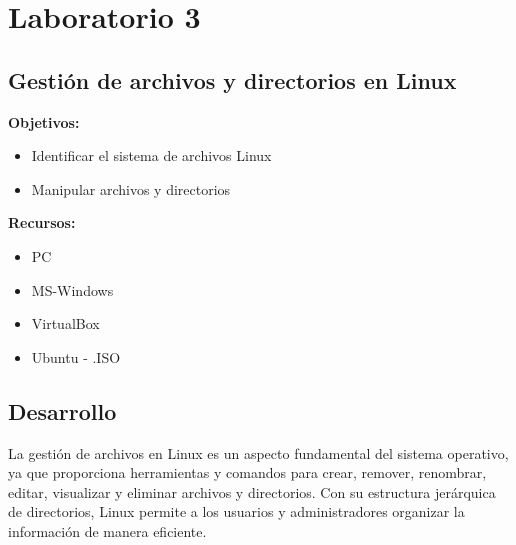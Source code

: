 \documentclass[11pt,twoside]{book}
\begin{document}
\section{ Laboratorio 3}
\subsection{Gestión de archivos y directorios en Linux}

\textbf{Objetivos:}
\begin{itemize}
  \item Identificar el sistema de archivos Linux
  \item Manipular archivos y directorios 

\end{itemize}

\textbf{Recursos:}
\begin{itemize}
  \item PC
  \item MS-Windows
  \item VirtualBox
  \item Ubuntu - .ISO
\end{itemize}

\subsection*{Desarrollo}
La gestión de archivos en Linux es un aspecto fundamental del sistema operativo, ya que proporciona herramientas y comandos para crear, remover, renombrar, editar, visualizar y eliminar archivos y directorios. Con su estructura jerárquica de directorios, Linux permite a los usuarios y administradores organizar la información de manera eficiente. 
\end{document}
